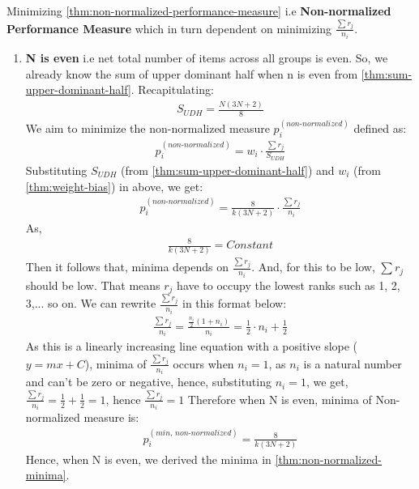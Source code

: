 \documentclass[a4paper,fleqn,review]{cas-sc}
\begin{document}
\begin{pot}[\ref{thm:non-normalized-minima}]
	Minimizing \autoref{thm:non-normalized-performance-measure} i.e \textbf{Non-normalized Performance Measure} which in turn dependent on minimizing $\frac{\sum r_j}{n_i}$.
\end{pot}
\begin{enumerate} 
	\item \textbf{N is even} i.e  net total number of items across all groups is even. So, we already know the sum of upper dominant half when n is even from \autoref{thm:sum-upper-dominant-half}. Recapitulating:
	\begin{align*}
		S_{UDH} = \frac{N(3N + 2)}{8}
	\end{align*}
	We aim to minimize the non-normalized measure $p_i^{(non\text{-}normalized)}$ defined as:
	\begin{align*}
		p_i^{(non\text{-}normalized)} = w_i \cdot \frac{\sum r_j}{ S_{UDH} }
	\end{align*}
	Substituting $S_{UDH}$ (from \autoref{thm:sum-upper-dominant-half}) and $w_i$ (from \autoref{thm:weight-bias}) in above, we get:
	\begin{align*}
		p_i^{(non\text{-}normalized)} = \frac{8}{k(3N + 2)}\cdot \frac{\sum r_j}{n_i}
		\label{eq:simplified-even-non-normalized}
	\end{align*}
	As, 
	\begin{align*}
		\frac{8}{k(3N + 2)} = Constant
	\end{align*}
	Then it follows that, minima depends on $\frac{\sum r_j}{n_i}$. And, for this to be low, $\sum r_j$ should be low. That means $r_j$ have to occupy the lowest ranks such as 1, 2, 3,... so on. We can rewrite $\frac{\sum r_j}{n_i}$ in this format below:
	\begin{align*}
		\frac{\sum r_j}{n_i} = \frac{\frac{n_i}{2}(1+n_i)}{n_i} = \frac{1}{2} \cdot n_i + \frac{1}{2}
	\end{align*}
	As this is a linearly increasing line equation with a positive slope ($y = mx + C$), minima of $\frac{\sum r_j}{n_i}$ occurs when $n_i = 1$, as $n_i$ is a natural number and can't be zero or negative, hence, substituting $n_i = 1$, we get, $\frac{\sum r_j}{n_i} = \frac{1}{2} + \frac{1}{2} = 1$, hence  $\frac{\sum r_j}{n_i} = 1 $
	Therefore when N is even, minima of Non-normalized measure is:
	\begin{align*}
		p_i^{(min, \, non\text{-}normalized)} = \frac{8}{k(3N + 2)}
	\end{align*}
		Hence, when N is even, we derived the minima in \autoref{thm:non-normalized-minima}.

\end{enumerate}
\end{document}
